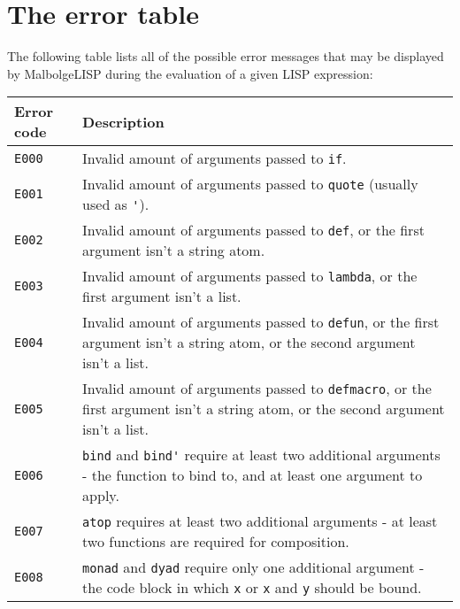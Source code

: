 
\section{The error table}

\par The following table lists all of the possible error messages that may be displayed by MalbolgeLISP during the evaluation of a given LISP expression:

\begin{longtable}{ | p{6em} | p{34em} | }
\hline
\textbf{Error code} & \textbf{Description}                                                                                                                           \\ \hline
\verb|E000|          & Invalid amount of arguments passed to \verb|if|.                                                                                               \\ \hline
\verb|E001|          & Invalid amount of arguments passed to \verb|quote| (usually used as \verb|'|).                                                                 \\ \hline
\verb|E002|          & Invalid amount of arguments passed to \verb|def|, or the first argument isn't a string atom.                                                   \\ \hline
\verb|E003|          & Invalid amount of arguments passed to \verb|lambda|, or the first argument isn't a list.                                                       \\ \hline
\verb|E004|          & Invalid amount of arguments passed to \verb|defun|, or the first argument isn't a string atom, or the second argument isn't a list.            \\ \hline
\verb|E005|          & Invalid amount of arguments passed to \verb|defmacro|, or the first argument isn't a string atom, or the second argument isn't a list.         \\ \hline
\verb|E006|          & \verb|bind| and \verb|bind'| require at least two additional arguments - the function to bind to, and at least one argument to apply.          \\ \hline
\verb|E007|          & \verb|atop| requires at least two additional arguments - at least two functions are required for composition.                                  \\ \hline
\verb|E008|          & \verb|monad| and \verb|dyad| require only one additional argument - the code block in which \verb|x| or \verb|x| and \verb|y| should be bound. \\ \hline

\end{longtable}
